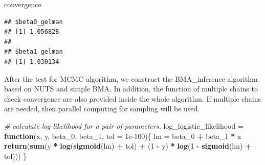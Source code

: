 \documentclass[
]{article}
\newenvironment{Shaded}{\begin{snugshade}}{\end{snugshade}}
\newcommand{\CommentTok}[1]{\textcolor[rgb]{0.56,0.35,0.01}{\textit{#1}}}
\newcommand{\ControlFlowTok}[1]{\textcolor[rgb]{0.13,0.29,0.53}{\textbf{#1}}}
\newcommand{\DataTypeTok}[1]{\textcolor[rgb]{0.13,0.29,0.53}{#1}}
\newcommand{\DecValTok}[1]{\textcolor[rgb]{0.00,0.00,0.81}{#1}}
\newcommand{\FloatTok}[1]{\textcolor[rgb]{0.00,0.00,0.81}{#1}}
\newcommand{\KeywordTok}[1]{\textcolor[rgb]{0.13,0.29,0.53}{\textbf{#1}}}
\newcommand{\NormalTok}[1]{#1}
\newcommand{\OperatorTok}[1]{\textcolor[rgb]{0.81,0.36,0.00}{\textbf{#1}}}
\newcommand{\StringTok}[1]{\textcolor[rgb]{0.31,0.60,0.02}{#1}}
\begin{document}
\begin{Shaded}
\begin{Highlighting}[]
\NormalTok{convergence}
\end{Highlighting}
\end{Shaded}

\begin{verbatim}
## $beta0_gelman
## [1] 1.056828
## 
## $beta1_gelman
## [1] 1.030134
\end{verbatim}

After the test for MCMC algorithm, we construct the BMA\_inference
algorithm based on NUTS and simple BMA. In addition, the function of
multiple chains to check convergence are also provided inside the whole
algorithm. If multiple chains are needed, then parallel computing for
sampling will be used.

\begin{Shaded}
\begin{Highlighting}[]
\CommentTok{# calculate log-likelihood for a pair of parameters.}
\NormalTok{log_logistic_likelihood =}\StringTok{ }\ControlFlowTok{function}\NormalTok{(x, y, beta_}\DecValTok{0}\NormalTok{, beta_}\DecValTok{1}\NormalTok{, }\DataTypeTok{tol =} \FloatTok{1e-100}\NormalTok{)\{}
\NormalTok{  lm =}\StringTok{ }\NormalTok{beta_}\DecValTok{0} \OperatorTok{+}\StringTok{ }\NormalTok{beta_}\DecValTok{1} \OperatorTok{*}\StringTok{ }\NormalTok{x}
  \KeywordTok{return}\NormalTok{(}\KeywordTok{sum}\NormalTok{(y }\OperatorTok{*}\StringTok{ }\KeywordTok{log}\NormalTok{(}\KeywordTok{sigmoid}\NormalTok{(lm) }\OperatorTok{+}\StringTok{ }\NormalTok{tol) }\OperatorTok{+}\StringTok{ }\NormalTok{(}\DecValTok{1} \OperatorTok{-}\StringTok{ }\NormalTok{y) }\OperatorTok{*}\StringTok{ }\KeywordTok{log}\NormalTok{(}\DecValTok{1} \OperatorTok{-}\StringTok{ }\KeywordTok{sigmoid}\NormalTok{(lm) }\OperatorTok{+}\StringTok{ }\NormalTok{tol)))}
\NormalTok{\}}




\end{Highlighting}
\end{Shaded}
\end{document}
